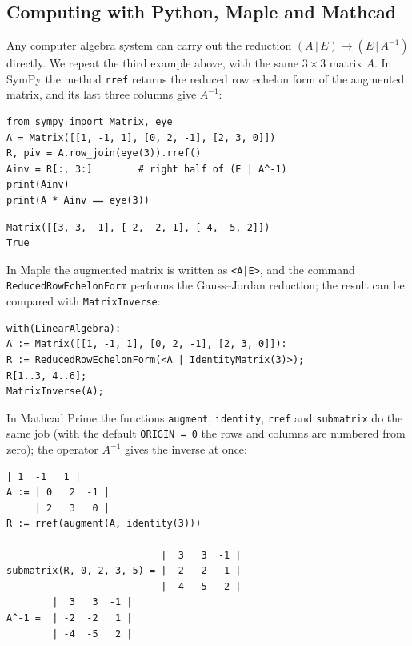\subsection{Computing with Python, Maple and Mathcad}
Any computer algebra system can carry out the reduction
$(A\,|\,E)\to(E\,|\,A^{-1})$ directly. We repeat the third example above, with
the same $3\times3$ matrix $A$. In SymPy the method
\texttt{rref} returns the reduced row echelon form of the augmented matrix, and
its last three columns give $A^{-1}$:
\begin{Verbatim}[fontsize=\footnotesize,frame=single,label={\small Python}]
from sympy import Matrix, eye
A = Matrix([[1, -1, 1], [0, 2, -1], [2, 3, 0]])
R, piv = A.row_join(eye(3)).rref()
Ainv = R[:, 3:]        # right half of (E | A^-1)
print(Ainv)
print(A * Ainv == eye(3))
\end{Verbatim}
\begin{Verbatim}[fontsize=\footnotesize,frame=single,label={\small Output}]
Matrix([[3, 3, -1], [-2, -2, 1], [-4, -5, 2]])
True
\end{Verbatim}
In Maple the augmented matrix is written as \texttt{<A|E>}, and the command
\texttt{ReducedRowEchelonForm} performs the Gauss–Jordan reduction; the result can
be compared with \texttt{MatrixInverse}:
\begin{Verbatim}[fontsize=\footnotesize,frame=single,label={\small Maple}]
with(LinearAlgebra):
A := Matrix([[1, -1, 1], [0, 2, -1], [2, 3, 0]]):
R := ReducedRowEchelonForm(<A | IdentityMatrix(3)>);
R[1..3, 4..6];
MatrixInverse(A);
\end{Verbatim}
In Mathcad Prime the functions \texttt{augment}, \texttt{identity}, \texttt{rref}
and \texttt{submatrix} do the same job (with the default \texttt{ORIGIN = 0} the
rows and columns are numbered from zero); the operator $A^{-1}$ gives the inverse
at once:
\begin{Verbatim}[fontsize=\footnotesize,frame=single,label={\small Mathcad}]
     | 1  -1   1 |
A := | 0   2  -1 |
     | 2   3   0 |
R := rref(augment(A, identity(3)))

                           |  3   3  -1 |
submatrix(R, 0, 2, 3, 5) = | -2  -2   1 |
                           | -4  -5   2 |
        |  3   3  -1 |
A^-1 =  | -2  -2   1 |
        | -4  -5   2 |
\end{Verbatim}
